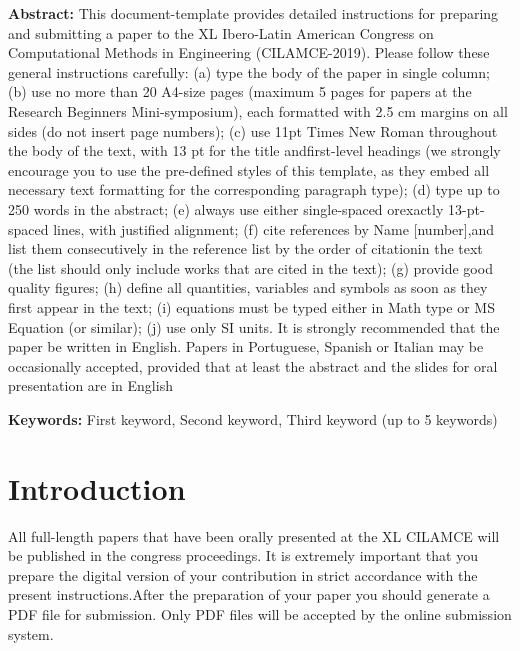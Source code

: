 \documentclass{cilamce19}
\begin{document}
\begin{titlepage}
\noindent %
\textbf{Abstract:} This document-template provides detailed instructions for preparing and submitting a paper to the XL Ibero-Latin American Congress on Computational Methods in Engineering (CILAMCE-2019). Please follow these general instructions carefully: (a) type the body of the paper in single column; (b) use no more than 20 A4-size pages (maximum 5 pages for papers at the Research Beginners Mini-symposium), each formatted with 2.5 cm margins on all sides (do not insert page numbers); (c) use 11pt Times New Roman throughout the body of the text, with 13 pt for the title andfirst-level headings (we strongly encourage you to use the pre-defined styles of this template, as they embed all necessary text formatting for the corresponding paragraph type); (d) type up to 250 words in the abstract; (e) always use either single-spaced orexactly 13-pt-spaced lines, with justified alignment; (f) cite references by Name [number],and list them consecutively in the reference list by the order of citationin the text (the list should only include works that are cited in the text); (g) provide good quality figures; (h) define all quantities, variables and symbols as soon as they first appear in the text; (i) equations must be typed either in Math type or MS Equation (or similar); (j) use only SI units. It is strongly recommended that the paper be written in English. Papers in Portuguese, Spanish or Italian may be occasionally accepted, provided that at least the abstract and the slides for oral presentation are in English

\noindent %
\textbf{Keywords:} First keyword, Second keyword, Third keyword (up to 5 keywords) 

\end{titlepage}




\section{Introduction}
   All full-length papers that have been orally presented at the XL CILAMCE will be published in the congress proceedings. It is extremely important that you prepare the digital version of your contribution in strict accordance with the present instructions.After the preparation of your paper you should generate a PDF file for submission. Only PDF files will be accepted by the online submission system.  
\end{document}
